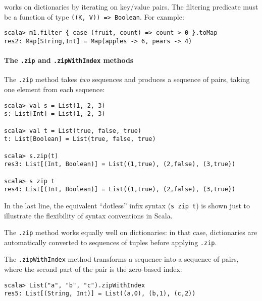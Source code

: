 works on dictionaries by iterating on key/value pairs. The filtering
predicate must be a function of type \lstinline!((K, V)) => Boolean!.
For example:
\begin{lstlisting}
scala> m1.filter { case (fruit, count) => count > 0 }.toMap
res2: Map[String,Int] = Map(apples -> 6, pears -> 4)
\end{lstlisting}

\paragraph*{The \lstinline!.zip! and
\lstinline!.zipWithIndex!
methods}

The \lstinline!.zip! method
takes \emph{two} sequences and produces a sequence of pairs, taking
one element from each sequence:
\begin{lstlisting}
scala> val s = List(1, 2, 3)
s: List[Int] = List(1, 2, 3)

scala> val t = List(true, false, true)
t: List[Boolean] = List(true, false, true)

scala> s.zip(t)
res3: List[(Int, Boolean)] = List((1,true), (2,false), (3,true))

scala> s zip t
res4: List[(Int, Boolean)] = List((1,true), (2,false), (3,true)) 
\end{lstlisting}
In the last line, the equivalent ``dotless'' infix syntax (\lstinline!s zip t!)
is shown just to illustrate the flexibility of syntax conventions
in Scala.

The \lstinline!.zip! method
works equally well on dictionaries: in that case, dictionaries are
automatically converted to sequences of tuples before applying \lstinline!.zip!.

The \lstinline!.zipWithIndex!
method transforms a sequence into a sequence of pairs, where the second
part of the pair is the zero-based index:
\begin{lstlisting}
scala> List("a", "b", "c").zipWithIndex
res5: List[(String, Int)] = List((a,0), (b,1), (c,2)) 
\end{lstlisting}

